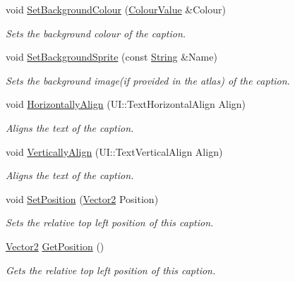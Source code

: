 \begin{DoxyCompactItemize}
void \hyperlink{classphys_1_1UI_1_1Caption_a73dc9d896640bc1fc9ab6584bfb86a7c}{SetBackgroundColour} (\hyperlink{classphys_1_1ColourValue}{ColourValue} \&Colour)
\begin{DoxyCompactList}\small\item\em Sets the background colour of the caption. \item\end{DoxyCompactList}\item 
void \hyperlink{classphys_1_1UI_1_1Caption_a98422dc633dfb68ea87d0f54fda25f48}{SetBackgroundSprite} (const \hyperlink{namespacephys_aa03900411993de7fbfec4789bc1d392e}{String} \&Name)
\begin{DoxyCompactList}\small\item\em Sets the background image(if provided in the atlas) of the caption. \item\end{DoxyCompactList}\item 
void \hyperlink{classphys_1_1UI_1_1Caption_a1b7d2736ee545f518c33f0cd99a4ef0a}{HorizontallyAlign} (UI::TextHorizontalAlign Align)
\begin{DoxyCompactList}\small\item\em Aligns the text of the caption. \item\end{DoxyCompactList}\item 
void \hyperlink{classphys_1_1UI_1_1Caption_adb3936d7eea2137e60943825acf4a5d0}{VerticallyAlign} (UI::TextVerticalAlign Align)
\begin{DoxyCompactList}\small\item\em Aligns the text of the caption. \item\end{DoxyCompactList}\item 
void \hyperlink{classphys_1_1UI_1_1Caption_a3428c4f67c085ccc93c977f964b51a33}{SetPosition} (\hyperlink{classphys_1_1Vector2}{Vector2} Position)
\begin{DoxyCompactList}\small\item\em Sets the relative top left position of this caption. \item\end{DoxyCompactList}\item 
\hyperlink{classphys_1_1Vector2}{Vector2} \hyperlink{classphys_1_1UI_1_1Caption_a3096383b16f81c3b4894afd61110ffa0}{GetPosition} ()
\begin{DoxyCompactList}\small\item\em Gets the relative top left position of this caption. \item\end{DoxyCompactList}\item 

\end{DoxyCompactItemize}
